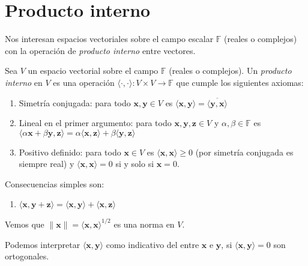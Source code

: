 \section{Producto interno}
\label{sec:producto-interno}

  Nos interesan espacios vectoriales sobre el campo escalar \(\mathbb{F}\)
  (reales o complejos)
  con la operación de \emph{producto interno} entre vectores.
  \begin{definition}
    \label{def:producto-interno-apx}
    Sea \(V\) un espacio vectorial sobre el campo \(\mathbb{F}\)
    (reales o complejos).
    Un \emph{producto interno} en \(V\) es una operación
    \(\langle \cdot, \cdot \rangle \colon V \times V \to \mathbb{F}\)
    que cumple los siguientes axiomas:
    \begin{enumerate}
    \item
      Simetría conjugada:
      para todo \(\mathbf{x}, \mathbf{y} \in V\) es
      \(\langle \mathbf{x}, \mathbf{y} \rangle
          = \overline{\langle \mathbf{y}, \mathbf{x} \rangle}\)
    \item
      Lineal en el primer argumento:
      para todo \(\mathbf{x}, \mathbf{y}, \mathbf{z} \in V\)
      y \(\alpha, \beta \in \mathbb{F}\) es
      \(\langle \alpha \mathbf{x} + \beta \mathbf{y}, \mathbf{z} \rangle
         = \alpha \langle \mathbf{x}, \mathbf{z} \rangle
             + \beta \langle \mathbf{y}, \mathbf{z} \rangle\)
    \item
      Positivo definido:
      para todo \(\mathbf{x} \in V\) es
      \(\langle \mathbf{x}, \mathbf{x} \rangle \ge 0\)
      (por simetría conjugada es siempre real)
      y \(\langle \mathbf{x}, \mathbf{x} \rangle = 0\)
      si y solo si \(\mathbf{x} = 0\).
    \end{enumerate}
  \end{definition}
  Consecuencias simples son:
  \begin{enumerate}
  \item
    \(\langle \mathbf{x}, \mathbf{y} + \mathbf{z} \rangle
        = \langle \mathbf{x}, \mathbf{y} \rangle
            + \langle \mathbf{x}, \mathbf{z} \rangle\)
  \end{enumerate}

  Vemos que \(\lVert \mathbf{x} \rVert
                 = \langle \mathbf{x}, \mathbf{x} \rangle^{1/2}\)
  es una norma en \(V\).

  Podemos interpretar \(\langle \mathbf{x}, \mathbf{y} \rangle\)
  como indicativo del  entre \(\mathbf{x}\) e \(\mathbf{y}\),
  si \(\langle \mathbf{x}, \mathbf{y} \rangle = 0\) son ortogonales.

